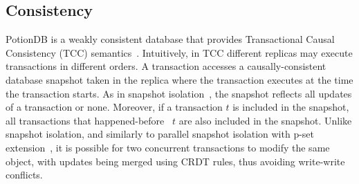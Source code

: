 \documentclass[sigplan,twocolumn,review,anonymous]{acmart}
\begin{document}



\subsection{Consistency}
\label{sec:consistency}

PotionDB is a weakly consistent database that provides Transactional Causal Consistency (TCC) 
semantics~\cite{cure,Wu20Transactional,walter}.
Intuitively, in TCC different replicas may execute transactions in different orders.
A transaction accesses a causally-consistent database snapshot taken in the replica where the transaction executes
at the time the transaction starts. 
As in snapshot isolation~\cite{Berenson95Critique},  the snapshot reflects all updates of a transaction or none.   
Moreover, if a transaction $t$ is included in the snapshot, all transactions that 
happened-before~\cite{lamport78}  $t$ are also included in the snapshot.
Unlike snapshot isolation, and similarly to parallel snapshot isolation with p-set extension~\cite{walter}, %
it is
possible for two concurrent transactions to modify the same object, with updates
being merged using CRDT rules, 
thus avoiding write-write conflicts. %
\end{document}
